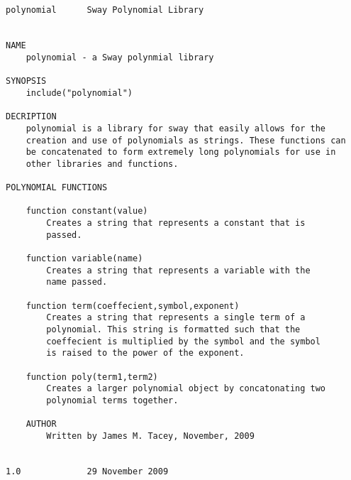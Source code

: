 \color{CodeGreen}
\begin{codesize}
\begin{verbatim}


polynomial		Sway Polynomial Library


NAME
	polynomial - a Sway polynmial library

SYNOPSIS
	include("polynomial")

DECRIPTION
	polynomial is a library for sway that easily allows for the 
	creation and use of polynomials as strings. These functions can 
	be concatenated to form extremely long polynomials for use in 
	other libraries and functions.

POLYNOMIAL FUNCTIONS

	function constant(value)
		Creates a string that represents a constant that is 
		passed.

	function variable(name)
		Creates a string that represents a variable with the 
		name passed.
	
	function term(coeffecient,symbol,exponent)
		Creates a string that represents a single term of a 
		polynomial. This string is formatted such that the 
		coeffecient is multiplied by the symbol and the symbol 
		is raised to the power of the exponent.
	
	function poly(term1,term2)
		Creates a larger polynomial object by concatonating two 
		polynomial terms together.
	
	AUTHOR
		Written by James M. Tacey, November, 2009


1.0				29 November 2009
\end{verbatim}
\end{codesize}
\color{black}
